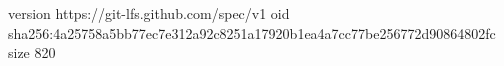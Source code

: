 version https://git-lfs.github.com/spec/v1
oid sha256:4a25758a5bb77ec7e312a92c8251a17920b1ea4a7cc77be256772d90864802fc
size 820
